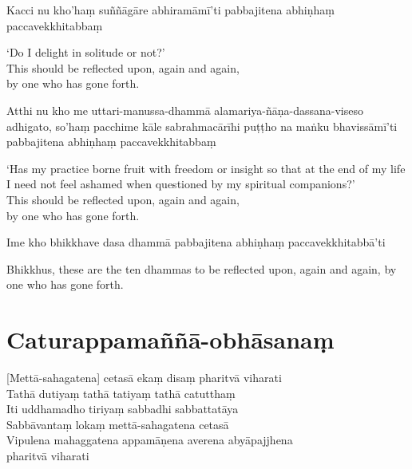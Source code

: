 Kacci nu kho'haṃ suññāgāre abhiramāmī'ti pabbajitena abhiṇhaṃ paccavekkhitabbaṃ

\begin{english}
  `Do I delight in solitude or not?'\\
  This should be reflected upon, again and again,\\
  by one who has gone forth.
\end{english}

Atthi nu kho me uttari-manussa-dhammā alamariya-ñāṇa-dassana-viseso adhigato, so'haṃ pacchime kāle sabrahmacārīhi puṭṭho na maṅku bhavissāmī'ti pabbajitena abhiṇhaṃ paccavekkhitabbaṃ

\begin{english}
  `Has my practice borne fruit with freedom or insight so that at the end of my life I need not feel ashamed when questioned by my spiritual companions?'\\
  This should be reflected upon, again and again,\\
  by one who has gone forth.
\end{english}

Ime kho bhikkhave dasa dhammā pabbajitena abhiṇhaṃ paccavekkhitabbā'ti

\begin{english}
  Bhikkhus, these are the ten dhammas to be reflected upon, again and again, by one who has gone forth.
\end{english}


\section{Caturappamaññā-obhāsanaṃ}


\begin{leader}
\end{leader}

[Mettā-sahagatena] cetasā ekaṃ disaṃ pharitvā viharati\\
Tathā dutiyaṃ tathā tatiyaṃ tathā catutthaṃ\\
Iti uddhamadho tiriyaṃ sabbadhi sabbattatāya\\
Sabbāvantaṃ lokaṃ mettā-sahagatena cetasā\\
Vipulena mahaggatena appamāṇena averena abyāpajjhena\\
\vin pharitvā viharati


